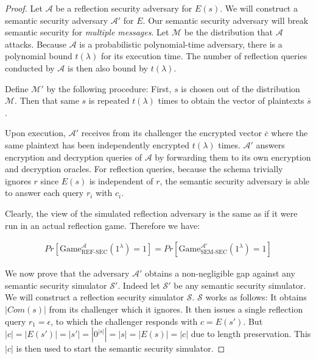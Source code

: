 \begin{proof}
    Let $\mathcal{A}$ be a reflection security adversary for $E(s)$. We will
    construct a semantic security adversary $\mathcal{A'}$ for $E$. Our semantic
    security adversary will break semantic security for \textit{multiple
    messages}. Let $\mathcal{M}$ be the distribution that $\mathcal{A}$
    attacks. Because $\mathcal{A}$ is a probabilistic polynomial-time
    adversary, there is a polynomial bound $t(\lambda)$ for its execution time.
    The number of reflection queries conducted by $\mathcal{A}$ is then also
    bound by $t(\lambda)$.

    Define $\mathcal{M'}$ by the following procedure: First, $s$ is chosen
    out of the distribution $\mathcal{M}$. Then that same $s$ is repeated
    $t(\lambda)$ times to obtain the vector of plaintexts $\overbar{s}$.

    Upon execution, $\mathcal{A'}$ receives from its challenger the encrypted
    vector $\overbar{c}$ where the same plaintext has been independently
    encrypted $t(\lambda)$ times.
    $\mathcal{A'}$ answers encryption and decryption queries of $\mathcal{A}$
    by forwarding them to its own encryption and
    decryption oracles. For reflection queries, because the schema trivially
    ignores $r$ since $E(s)$ is independent of $r$, the semantic security
    adversary is able to answer each query $r_i$ with $c_i$.

    Clearly, the view of the simulated reflection adversary is the same as if
    it were run in an actual reflection game. Therefore we have:

    \begin{align*}
        Pr[\text{Game}_{\text{REF-SEC}}^{\mathcal{A}}(1^{\lambda})
        = 1]
        =
        Pr[\text{Game}_{\text{SEM-SEC}}^{\mathcal{A'}}(1^{\lambda})
        = 1]
    \end{align*}

    We now prove that the adversary $\mathcal{A'}$ obtains a non-negligible gap
    against any semantic security simulator $\mathcal{S'}$. Indeed let
    $\mathcal{S'}$ be any semantic security simulator. We will construct a
    reflection security simulator $\mathcal{S}$. $\mathcal{S}$ works as
    follows: It obtains $|Com(s)|$ from its challenger which it ignores. It
    then issues a single reflection query $r_1 = \epsilon$, to which the
    challenger responds with $c = E(s')$. But $|c| = |E(s')| = |s'| =
    |0^{|s|}| = |s| = |E(s)| = |c|$ due to length preservation. This $|c|$ is
    then used to start the semantic security simulator.


\end{proof}
